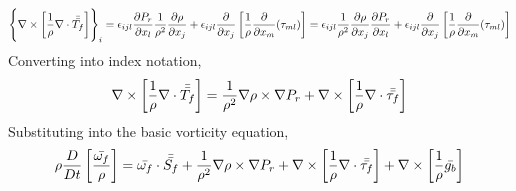 \documentclass[class=report, 12pt, crop=false]{standalone}
\begin{document}
\begin{center}
$$\left\{\nabla\times\left[\frac{1}{\rho}\nabla\cdot\bar{\bar{T_f}}\right]\right\}_i = \epsilon_{ijl}\frac{\partial P_r}{\partial x_l}\frac{1}{\rho^2}\frac{\partial \rho}{\partial x_j} + \epsilon_{ijl}\frac{\partial}{\partial x_j}\left[\frac{1}{\rho}\frac{\partial }{\partial x_m}(\tau_{ml})\right] = \epsilon_{ijl}\frac{1}{\rho^2}\frac{\partial \rho}{\partial x_j}\frac{\partial P_r}{\partial x_l} + \epsilon_{ijl}\frac{\partial}{\partial x_j}\left[\frac{1}{\rho}\frac{\partial }{\partial x_m}(\tau_{ml})\right]$$
Converting into index notation,
$$\nabla\times\left[\frac{1}{\rho}\nabla\cdot\bar{\bar{T_f}}\right] =  \frac{1}{\rho^2}\nabla\rho\times\nabla P_r + \nabla\times\left[\frac{1}{\rho}\nabla\cdot\bar{\bar{\tau_f}}\right]$$
Substituting into the basic vorticity equation,
$$\rho\frac{D}{Dt}\left[\frac{\bar{\omega_f}}{\rho}\right] = \bar{\omega_f} \cdot \bar{\bar{S_f}} + \frac{1}{\rho^2}\nabla\rho\times\nabla P_r + \nabla\times\left[\frac{1}{\rho}\nabla\cdot\bar{\bar{\tau_f}}\right] + \nabla\times\left[\frac{1}{\rho}\bar{g_b}\right]$$




\end{center}
\end{document}
